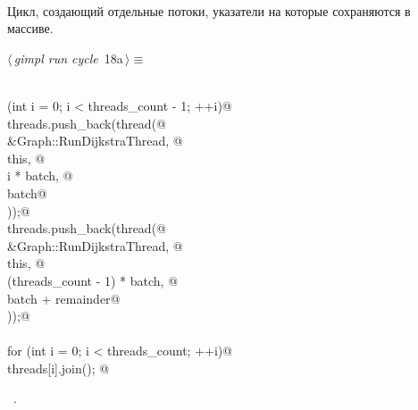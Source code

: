\documentclass[12pt]{article}
\begin{document}
\paragraph{}
Цикл, создающий отдельные потоки, указатели на которые сохраняются в массиве.
\begin{flushleft} \small
\begin{minipage}{\linewidth}\label{scrap30}\raggedright\small
{} $\langle\,${\itshape gimpl run cycle}\nobreak\ {\footnotesize {18a}}$\,\rangle\equiv$
\vspace{-1ex}
\begin{list}{}{} \item
\mbox{}\verb@@\\
\mbox{}\verb@for (int i = 0; i < threads_count - 1; ++i)@\\
\mbox{}\verb@        threads.push_back(thread(@\\
\mbox{}\verb@          &Graph::RunDijkstraThread, @\\
\mbox{}\verb@          this, @\\
\mbox{}\verb@          i * batch, @\\
\mbox{}\verb@          batch@\\
\mbox{}\verb@        ));@\\
\mbox{}\verb@    threads.push_back(thread(@\\
\mbox{}\verb@        &Graph::RunDijkstraThread, @\\
\mbox{}\verb@        this, @\\
\mbox{}\verb@        (threads_count - 1) * batch, @\\
\mbox{}\verb@        batch + remainder@\\
\mbox{}\verb@      ));@\\
\mbox{}\verb@@\\
\mbox{}\verb@  for (int i = 0; i < threads_count; ++i)@\\
\mbox{}\verb@        threads[i].join(); @\\
\mbox{}\verb@@{\NWsep}
\end{list}
\vspace{-1.5ex}
\footnotesize
\begin{list}{}{\setlength{\itemsep}{-\parsep}\setlength{\itemindent}{-\leftmargin}}
\item \NWtxtMacroRefIn\ .

\item{}
\end{list}
\end{minipage}\vspace{4ex}
\end{flushleft}
\end{document}
